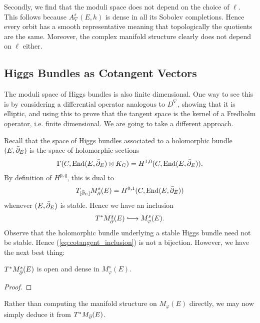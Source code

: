 \documentclass[12pt]{ociamthesis}  %
\begin{document}
Secondly, we find that the moduli space does not depend on the
choice of $\ell$. This follows because $A_\nabla^{s}(E,h)$
is dense in all its Sobolev completions. Hence every orbit has a
smooth representative meaning that topologically the quotients are
the same. Moreover, the complex manifold structure clearly
does not depend on $\ell$ either.

\subsection{Higgs Bundles as Cotangent Vectors}

The moduli space of Higgs bundles is also finite dimensional. One way to
see this is by considering a differential operator analogous to $D^\nabla$,
showing that it is elliptic, and using this to prove that the
tangent space is the kernel of a Fredholm operator, i.e. finite
dimensional. We are going to take a different approach.

Recall that the space of Higgs bundles associated to a holomorphic
bundle $(E,{\bar{\partial}}_E)$ is the space of holomorphic sections
\begin{align*}
  \Gamma(C,\operatorname{End}(E,{\bar{\partial}}_E) \otimes K_C) = H^{1,0}(C,\operatorname{End}(E,{\bar{\partial}}_E)).
\end{align*}
By definition of $H^{p,q}$, this is dual to
\begin{align*}
  T_{[{\bar{\partial}}_E]}M^s_{\bar{\partial}}(E) = H^{0,1}(C,\operatorname{End}(E,{\bar{\partial}}_E))
\end{align*}
whenever $(E,{\bar{\partial}}_E)$ is stable. Hence we have an inclusion
\begin{align}\label{eq:cotangent_inclusion}
  T^*M^s_\dol(E) \longinc M^s_\varphi(E).
\end{align}
Observe that the holomorphic bundle underlying a stable Higgs bundle need
not be stable. Hence (\ref{eq:cotangent_inclusion}) is not a bijection.
However, we have the next best thing:

\begin{theorem}\label{thm:stables_are_dense}
  $T^*M^s_{\bar{\partial}}(E)$ is open and dense in $M^s_\varphi(E)$.
  \begin{proof}
    \missingproof
  \end{proof}
\end{theorem}

Rather than computing the manifold structure on $M_\varphi(E)$
directly, we may now simply deduce it from $T^*M_{\bar{\partial}}(E)$.
\end{document}
